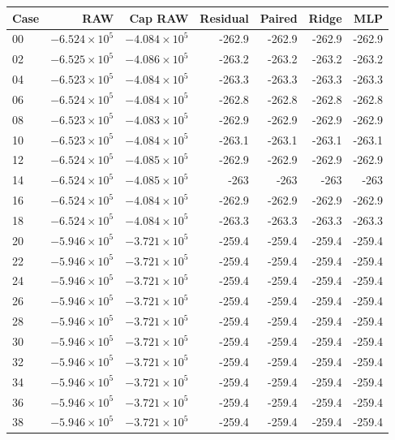 \begin{tabular}{lrrrrrr}
\toprule
Case & RAW & Cap RAW & Residual & Paired & Ridge & MLP \\
\midrule
00 & \(-6.524\times10^{5}\) & \(-4.084\times10^{5}\) & -262.9 & -262.9 & -262.9 & -262.9 \\
02 & \(-6.525\times10^{5}\) & \(-4.086\times10^{5}\) & -263.2 & -263.2 & -263.2 & -263.2 \\
04 & \(-6.523\times10^{5}\) & \(-4.084\times10^{5}\) & -263.3 & -263.3 & -263.3 & -263.3 \\
06 & \(-6.524\times10^{5}\) & \(-4.084\times10^{5}\) & -262.8 & -262.8 & -262.8 & -262.8 \\
08 & \(-6.523\times10^{5}\) & \(-4.083\times10^{5}\) & -262.9 & -262.9 & -262.9 & -262.9 \\
10 & \(-6.523\times10^{5}\) & \(-4.084\times10^{5}\) & -263.1 & -263.1 & -263.1 & -263.1 \\
12 & \(-6.524\times10^{5}\) & \(-4.085\times10^{5}\) & -262.9 & -262.9 & -262.9 & -262.9 \\
14 & \(-6.524\times10^{5}\) & \(-4.085\times10^{5}\) & -263 & -263 & -263 & -263 \\
16 & \(-6.524\times10^{5}\) & \(-4.084\times10^{5}\) & -262.9 & -262.9 & -262.9 & -262.9 \\
18 & \(-6.524\times10^{5}\) & \(-4.084\times10^{5}\) & -263.3 & -263.3 & -263.3 & -263.3 \\
20 & \(-5.946\times10^{5}\) & \(-3.721\times10^{5}\) & -259.4 & -259.4 & -259.4 & -259.4 \\
22 & \(-5.946\times10^{5}\) & \(-3.721\times10^{5}\) & -259.4 & -259.4 & -259.4 & -259.4 \\
24 & \(-5.946\times10^{5}\) & \(-3.721\times10^{5}\) & -259.4 & -259.4 & -259.4 & -259.4 \\
26 & \(-5.946\times10^{5}\) & \(-3.721\times10^{5}\) & -259.4 & -259.4 & -259.4 & -259.4 \\
28 & \(-5.946\times10^{5}\) & \(-3.721\times10^{5}\) & -259.4 & -259.4 & -259.4 & -259.4 \\
30 & \(-5.946\times10^{5}\) & \(-3.721\times10^{5}\) & -259.4 & -259.4 & -259.4 & -259.4 \\
32 & \(-5.946\times10^{5}\) & \(-3.721\times10^{5}\) & -259.4 & -259.4 & -259.4 & -259.4 \\
34 & \(-5.946\times10^{5}\) & \(-3.721\times10^{5}\) & -259.4 & -259.4 & -259.4 & -259.4 \\
36 & \(-5.946\times10^{5}\) & \(-3.721\times10^{5}\) & -259.4 & -259.4 & -259.4 & -259.4 \\
38 & \(-5.946\times10^{5}\) & \(-3.721\times10^{5}\) & -259.4 & -259.4 & -259.4 & -259.4 \\
\bottomrule
\end{tabular}
